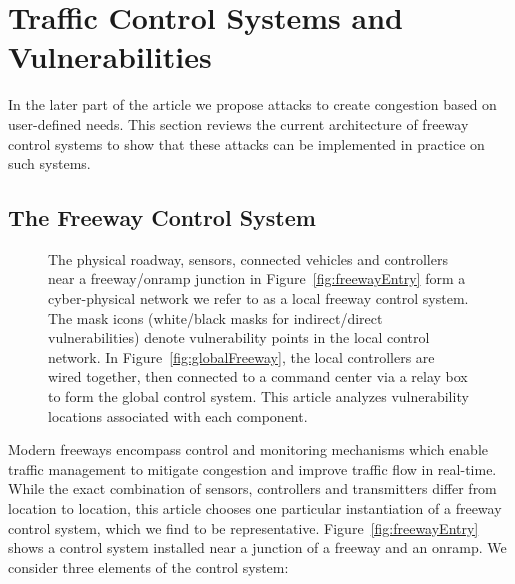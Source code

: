 \section{Traffic Control Systems and Vulnerabilities}

In the later part of the article we propose attacks to create congestion based on user-defined needs. This section reviews the current architecture of freeway control systems to show that these attacks can be implemented in practice on such systems.

	\subsection{The Freeway Control System}
	\label{sub:freeway-control-system}

	\begin{figure}

	\hfill
	\caption[Local and global freeway control system architectures with labeled vulnerability points.]{The physical roadway, sensors, connected vehicles and controllers near a freeway/onramp junction in Figure~\ref{fig:freewayEntry} form a cyber-physical network we refer to as a local freeway control system. The mask icons (white/black masks for indirect/direct vulnerabilities) denote vulnerability points in the local control network.  In Figure~\ref{fig:globalFreeway}, the local controllers are wired together, then connected to a command center via a relay box to form the global control system. This article analyzes vulnerability locations associated with each component.}
	\end{figure}
    		Modern freeways encompass control and monitoring mechanisms which enable traffic management to mitigate congestion and improve traffic flow in real-time. While the exact combination of sensors, controllers and transmitters differ from location to location, this article chooses one particular instantiation of a freeway control system, which we find to be representative. Figure~\ref{fig:freewayEntry} shows a control system installed near a junction of a freeway and an onramp. We consider three elements of the control system:
